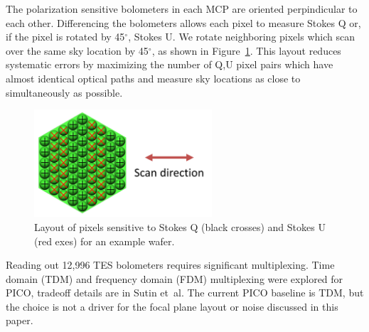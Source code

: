 \documentclass[]{spie}  %
\newcommand{\comr}[1]{\textcolor{red}{#1}}
\newcommand{\dgr}{$^\circ$}
\begin{document}
The polarization sensitive bolometers in each MCP are oriented perpindicular to each other. Differencing the bolometers allows each pixel to measure Stokes Q or, if the 
pixel is rotated by 45\dgr, Stokes U. We rotate neighboring pixels which scan over the same sky location by 45\dgr, as shown in Figure~\ref{fig:QU}.
This layout reduces systematic errors by maximizing the number of Q,U pixel pairs which have almost identical optical paths and measure sky locations 
as close to simultaneously as possible.  %

\begin{figure} [ht]
\begin{center}
\includegraphics[height=4cm]{QU_wafer.png}
\end{center}
\caption { \label{fig:QU} 
Layout of pixels sensitive to Stokes Q (black crosses) and Stokes U (red exes) for an example wafer.}
\end{figure}

Reading out 12,996 TES bolometers requires significant multiplexing.  Time domain (TDM) and frequency domain (FDM) 
multiplexing were explored for PICO, tradeoff details are in Sutin et~al.\cite{brian_spie}  %
The current PICO baseline is TDM, 
but the choice is not a driver for the focal plane layout or noise discussed in this paper.



\end{document}
